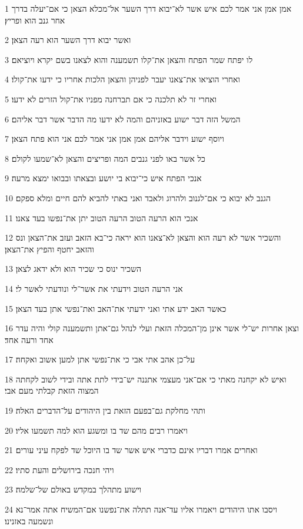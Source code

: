 \par 1 אמן אמן אני אמר לכם איש אשר לא־יבוא דרך השער אל־מכלא הצאן כי אם־יעלה בדרך אחר גנב הוא ופריץ׃
\par 2 ואשר יבוא דרך השער הוא רעה הצאן׃
\par 3 לו יפתח שמר הפתח והצאן את־קלו תשמענה והוא לצאנו בשם יקרא ויוציאם׃
\par 4 ואחרי הוציאו את־צאנו יעבר לפניהן והצאן הלכות אחריו כי ידעו את־קולו׃
\par 5 ואחרי זר לא תלכנה כי אם תברחנה מפניו את־קול הזרים לא ידעו׃
\par 6 המשל הזה דבר ישוע באזניהם והמה לא ידעו מה הדבר אשר דבר אליהם׃
\par 7 ויוסף ישוע וידבר אליהם אמן אמן אני אמר לכם אני הוא פתח הצאן׃
\par 8 כל אשר באו לפני גנבים המה ופריצים והצאן לא־שמעו לקולם׃
\par 9 אנכי הפתח איש כי־יבוא בי יושע ובצאתו ובבואו ימצא מרעה׃
\par 10 הגנב לא יבוא כי אם־לגנוב ולהרוג ולאבד ואני באתי להביא להם חיים ומלא ספקם׃
\par 11 אנכי הוא הרעה הטוב הרעה הטוב יתן את־נפשו בעד צאנו׃
\par 12 והשכיר אשר לא רעה הוא והצאן לא־צאנו הוא יראה כי־בא הזאב ועזב את־הצאן ונס והזאב יחטף והפיץ את־הצאן׃
\par 13 השכיר ינוס כי שכיר הוא ולא ידאג לצאן׃
\par 14 אני הרעה הטוב וידעתי את אשר־לי ונודעתי לאשר לי׃
\par 15 כאשר האב ידע אתי ואני ידעתי את־האב ואת־נפשי אתן בעד הצאן׃
\par 16 וצאן אחרות יש־לי אשר אינן מן־המכלה הזאת ועלי לנהל גם־אתן ותשמענה קולי והיה עדר אחד ורעה אחד׃
\par 17 על־כן אהב אתי אבי כי את־נפשי אתן למען אשוב ואקחה׃
\par 18 ואיש לא יקחנה מאתי כי אם־אני מעצמי אתננה יש־בידי לתת אתה ובידי לשוב לקחתה המצוה הזאת קבלתי מעם אבי׃
\par 19 ותהי מחלקת גם־בפעם הזאת בין היהודים על־הדברים האלה׃
\par 20 ויאמרו רבים מהם שד בו ומשגע הוא למה תשמעו אליו׃
\par 21 ואחרים אמרו דבריו אינם כדברי איש אשר שד בו היוכל שד לפקח עיני עורים׃
\par 22 ויהי חנכה בירושלים והעת סתיו׃
\par 23 וישוע מתהלך במקדש באולם של־שלמה׃
\par 24 ויסבו אתו היהודים ויאמרו אליו עד־אנה תתלה את־נפשנו אם־המשיח אתה אמר־נא ונשמעה באזנינו׃
